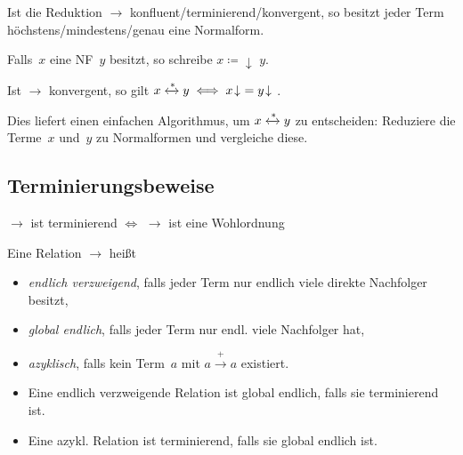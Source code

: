 \documentclass{cheat-sheet}
\newcommand{\strictlyReducesTo}{\xrightarrow{+}}
\newcommand{\zzEq}{\xleftrightarrow{*}} %
\newcommand{\NF}[1]{{#1}\!\downarrow\,\,} %
\begin{document}
\begin{lem}
  Ist die Reduktion ${\to}$ konfluent/terminierend/konvergent, so besitzt jeder Term höchstens/mindestens/genau eine Normalform.
\end{lem}

\begin{nota}
  Falls~$x$ eine NF~$y$ besitzt, so schreibe $x \NF \coloneqq y$.
\end{nota}

\begin{thm}
  Ist ${\to}$ konvergent, so gilt $x \zzEq y \iff \NF{x} = \NF{y}$.
\end{thm}

\begin{bem}
  Dies liefert einen einfachen Algorithmus, um $x \zzEq y$ zu entscheiden: Reduziere die Terme~$x$ und~$y$ zu Normalformen und vergleiche diese.
\end{bem}

\subsection{Terminierungsbeweise}

\begin{lem}
  ${\to}$ ist terminierend $\iff$ ${\to}$ ist eine Wohlordnung
\end{lem}

\begin{defn}
  Eine Relation ${\to}$ heißt
  \begin{itemize}
    \item \emph{endlich verzweigend}, falls jeder Term nur endlich viele direkte Nachfolger besitzt,
    \item \emph{global endlich}, falls jeder Term nur endl. viele Nachfolger hat,
    \item \emph{azyklisch}, falls kein Term~$a$ mit $a \strictlyReducesTo a$ existiert.
  \end{itemize}
\end{defn}

\begin{lem}
  \begin{itemize}
    \item Eine endlich verzweigende Relation ist global endlich, falls sie terminierend ist.
    \item Eine azykl. Relation ist terminierend, falls sie global endlich ist.
  \end{itemize}
\end{lem}
\end{document}
